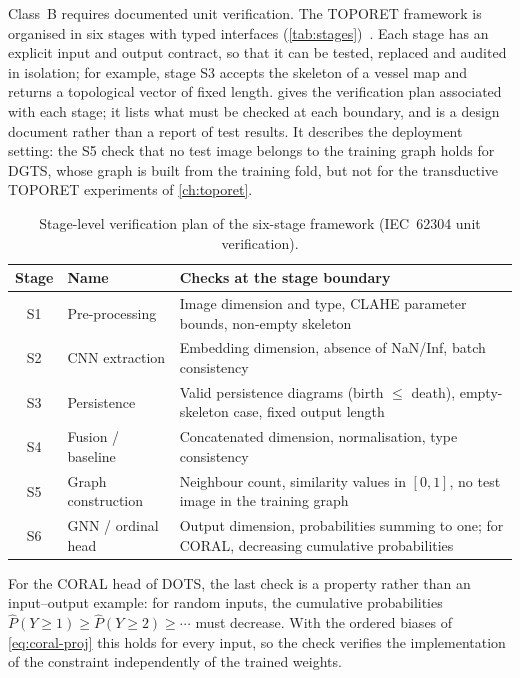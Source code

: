 Class~B requires documented unit verification. The TOPORET framework is organised in six
stages with typed interfaces (\cref{tab:stages})~\cite{belhadj2026enase}. Each stage has an
explicit input and output contract, so that it can be tested, replaced and audited in
isolation; for example, stage S3 accepts the skeleton of a vessel map and returns a
topological vector of fixed length.  gives the verification plan
associated with each stage; it lists what must be checked at each boundary, and is a
design document rather than a report of test results. It describes the deployment setting:
the S5 check that no test image belongs to the training graph holds for DGTS, whose graph
is built from the training fold, but not for the transductive TOPORET experiments of
\cref{ch:toporet}.

\begin{table}[H]
\centering
\caption[Stage-level verification plan (IEC 62304)]{Stage-level verification plan of the
six-stage framework (IEC~62304 unit verification).}
\label{tab:unittests}
\small
\begin{tabular}{@{}c l P{9.6cm}@{}}
\toprule
Stage & Name & Checks at the stage boundary \\
\midrule
S1 & Pre-processing & Image dimension and type, CLAHE parameter bounds, non-empty skeleton \\
S2 & CNN extraction & Embedding dimension, absence of NaN/Inf, batch consistency \\
S3 & Persistence & Valid persistence diagrams (birth $\leq$ death), empty-skeleton case, fixed output length \\
S4 & Fusion / baseline & Concatenated dimension, normalisation, type consistency \\
S5 & Graph construction & Neighbour count, similarity values in $[0,1]$, no test image in the training graph \\
S6 & GNN / ordinal head & Output dimension, probabilities summing to one; for CORAL, decreasing cumulative probabilities \\
\bottomrule
\end{tabular}
\end{table}

For the CORAL head of DOTS, the last check is a property rather than an input--output
example: for random inputs, the cumulative probabilities $\hat P(Y\geq1)\geq\hat
P(Y\geq2)\geq\cdots$ must decrease. With the ordered biases of \cref{eq:coral-proj} this
holds for every input, so the check verifies the implementation of the constraint
independently of the trained weights.

